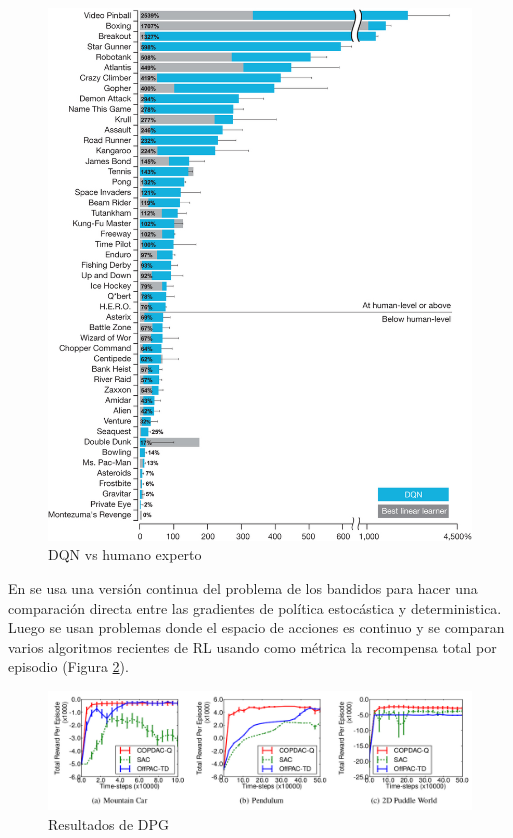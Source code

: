 \begin{figure}[htb]
\centering
\includegraphics[width=150mm]{./graficos/dqn_vs_human.jpg}
\caption{DQN vs humano experto} \label{fig:dqn_vs_human}
\end{figure}

En \cite{silver2014deterministic} se usa una versión continua del problema de los bandidos para hacer una comparación directa entre las gradientes de política estocástica y deterministica. Luego se usan problemas donde el espacio de acciones es continuo y se comparan varios algoritmos recientes de \ac{RL} usando como métrica la recompensa total por episodio (Figura \ref{fig:dpg_results}).

\begin{figure}[htb]
\centering
\includegraphics[width=150mm]{./graficos/dpg_results.png}
\caption{Resultados de \ac{DPG}} \label{fig:dpg_results}
\end{figure}

